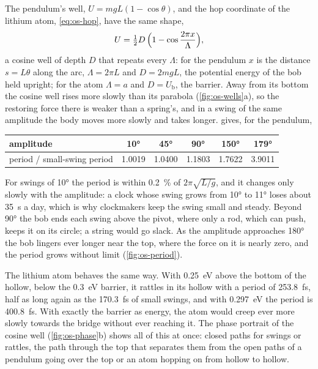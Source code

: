 The pendulum's well, $U = mgL(1 - \cos\theta)$, and the hop coordinate of
the lithium atom, \cref{eq:os-hop}, have the same shape,
\begin{equation*}
   U = \tfrac12 D\,\Bigl(1 - \cos\frac{2\pi x}{\Lambda}\Bigr) ,
\end{equation*}
a cosine well of depth $D$ that repeats every $\Lambda$: for the
pendulum $x$ is the distance $s = L\theta$ along the arc, $\Lambda =
2\pi L$ and $D = 2mgL$, the potential energy of the bob held upright; for the atom $\Lambda = a$ and $D = U_{\mathrm b}$,
the barrier. Away from its bottom the cosine well rises more slowly than
its parabola (\cref{fig:os-wells}a), so the restoring force there is
weaker than a spring's, and in a swing of the same amplitude the body
moves more slowly and takes longer.  gives, for the pendulum,
\begin{center}
\begin{tabular}{lccccc}
\toprule
amplitude & \ang{10} & \ang{45} & \ang{90} & \ang{150} & \ang{179}\\
\midrule
period / small-swing period & 1.0019 & 1.0400 & 1.1803 & 1.7622 & 3.9011\\
\bottomrule
\end{tabular}
\end{center}
For swings of \ang{10} the period is within \SI{0.2}{\percent} of
$2\pi\sqrt{L/g}$, and it changes only slowly with the amplitude: a clock
whose swing grows from \ang{10} to \ang{11} loses about \SI{35}{\second} a
day, which is why clockmakers keep the swing small and steady. Beyond \ang{90} the bob
ends each swing above the pivot, where only a rod, which can push, keeps
it on its circle; a string would go slack. As the amplitude approaches
\ang{180}
the bob lingers ever longer near the top, where the force on it is
nearly zero, and the period grows without limit (\cref{fig:os-period}).

The lithium atom behaves the same way. With \SI{0.25}{\electronvolt} above
the bottom of the hollow,
below the \SI{0.3}{\electronvolt} barrier, it rattles in its hollow with a
period of \SI{253.8}{\femto\second}, half as long again as the
\SI{170.3}{\femto\second} of small swings, and with
\SI{0.297}{\electronvolt} the period is \SI{400.8}{\femto\second}. With exactly
the barrier as energy, the atom would creep ever more slowly towards the
bridge without ever reaching it. The phase
portrait of the cosine well (\cref{fig:os-phase}b) shows all of this at
once: closed paths for swings or rattles, the path through the top that
separates them from the open paths of a pendulum going over the top or an
atom hopping on from hollow to hollow.

